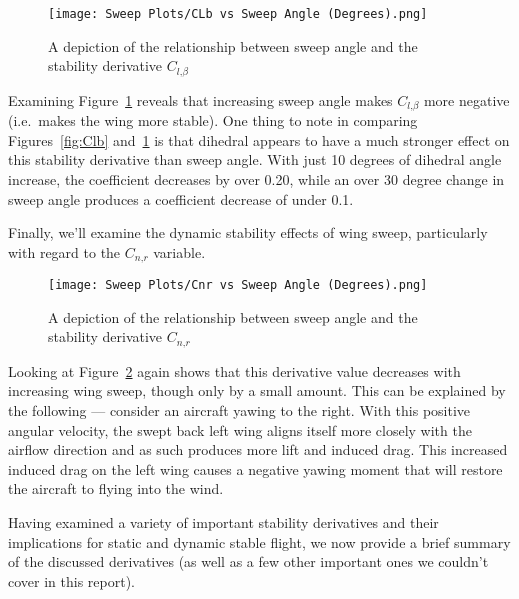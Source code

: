 \documentclass{article}
\begin{document}
\begin{figure}[H]
    \centering
    \texttt{[image: Sweep Plots/CLb vs Sweep Angle (Degrees).png]}
    \caption{A depiction of the relationship between sweep angle and the stability derivative $C_{l \text{,} \beta}$\label{fig:Clb_sweep}}
\end{figure}

Examining Figure~\ref{fig:Clb_sweep} reveals that increasing sweep angle makes $C_{l\text{,}\beta}$ more negative (i.e.\ makes the wing more stable). 
One thing to note in comparing Figures~\ref{fig:Clb} and~\ref{fig:Clb_sweep} is that dihedral appears to have a much stronger effect on this stability derivative than sweep angle.
With just 10 degrees of dihedral angle increase, the coefficient decreases by over 0.20, while an over 30 degree change in sweep angle produces a coefficient decrease of under 0.1.

Finally, we'll examine the dynamic stability effects of wing sweep, particularly with regard to the $C_{n\text{,} r}$ variable.

\begin{figure}[H]
    \centering
    \texttt{[image: Sweep Plots/Cnr vs Sweep Angle (Degrees).png]}
    \caption{A depiction of the relationship between sweep angle and the stability derivative $C_{n \text{,} r}$\label{fig:Cnr_sweep}}
\end{figure}

Looking at Figure~\ref{fig:Cnr_sweep} again shows that this derivative value decreases with increasing wing sweep, though only by a small amount.
This can be explained by the following --- consider an aircraft yawing to the right.
With this positive angular velocity, the swept back left wing aligns itself more closely with the airflow direction and as such produces more lift and induced drag.
This increased induced drag on the left wing causes a negative yawing moment that will restore the aircraft to flying into the wind.

\bigskip
\bigskip

Having examined a variety of important stability derivatives and their implications for static and dynamic stable flight, we now provide a brief summary of the discussed derivatives (as well as a few other important ones we couldn't cover in this report).
\end{document}
